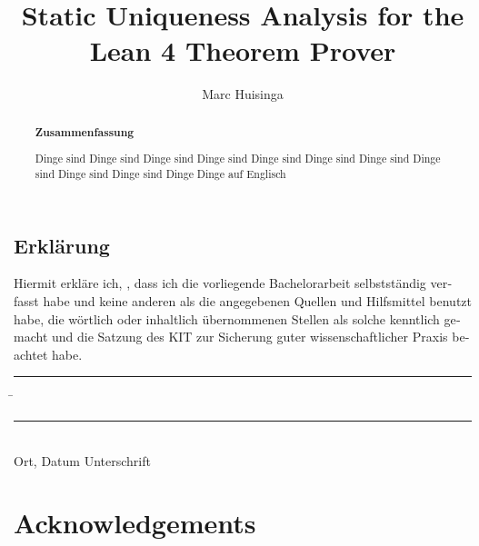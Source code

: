 \documentclass[parskip=full,12pt,a4paper,twoside,headings=openright, fleqn]{scrreprt}
\title{Static Uniqueness Analysis for the Lean 4 Theorem Prover}
\author{Marc Huisinga}
\begin{document}
\begin{otherlanguage}{ngerman} %
\mytitlepage
\end{otherlanguage}

\begin{abstract}
\begin{center}\Huge\textbf{\textsf{Zusammenfassung}}
\end{center}
\vfill

Dinge sind Dinge sind Dinge sind Dinge sind Dinge sind Dinge sind Dinge sind Dinge sind Dinge sind Dinge sind Dinge
\vfill
Dinge auf Englisch
\vfill
\end{abstract}

\tableofcontents














\begin{otherlanguage}{ngerman}
\chapter*{Erklärung}
\pagestyle{empty}

  \vspace{20mm}
  Hiermit erkläre ich, \theauthor, dass ich die vorliegende Bachelorarbeit selbst\-ständig
verfasst habe und keine anderen als die angegebenen Quellen und Hilfsmittel
benutzt habe, die wörtlich oder inhaltlich übernommenen Stellen als solche kenntlich gemacht und
die Satzung des KIT zur Sicherung guter wissenschaftlicher Praxis beachtet habe.
  \vspace{20mm}
  \begin{tabbing}
  \rule{7cm}{.4pt}\hspace{1cm} \= \rule{6.8cm}{.4pt} \\
 Ort, Datum \> Unterschrift
  \end{tabbing}
\end{otherlanguage}

\chapter*{Acknowledgements}
\pagestyle{empty}

\pagestyle{fancy}
\appendix


\end{document}
